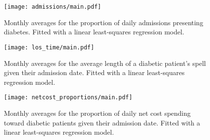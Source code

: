 \begin{figure}
    \centering
    \texttt{[image: admissions/main.pdf]}
    \caption{Monthly averages for the proportion of daily admissions presenting
        diabetes. Fitted with a linear least-squares regression model.}%
    \label{fig:admissions}
\end{figure}

\begin{figure}
    \centering
    \texttt{[image: los\_time/main.pdf]}
    \caption{Monthly averages for the average length of a diabetic patient's
        spell given their admission date. Fitted with a linear least-squares
        regression model.}%
    \label{fig:los_time}
\end{figure}

\begin{figure}
    \centering
    \texttt{[image: netcost\_proportions/main.pdf]}
    \caption{Monthly averages for the proportion of daily net cost spending
        toward diabetic patients given their admission date. Fitted with a
        linear least-squares regression model.}%
    \label{fig:netcost_proportions}
\end{figure}
